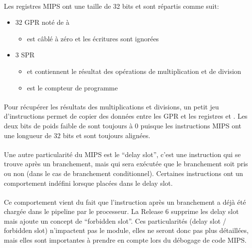 \documentclass[11pt, book, english, french, standardlists]{upmethodology-document}
\begin{document}
				\paragraph*{}
					Les registres \gls{MIPS} ont une taille de 32 bits et sont répartis comme suit:
					\begin{itemize}
						\item 32 \gls{GPR} noté de  à 
							\begin{itemize}
								\item {} est câblé à zéro et les écritures sont ignorées
							\end{itemize}
						\item 3 \gls{SPR}
							\begin{itemize}
								\item {} et  contiennent le résultat des opérations de multiplication et de division
								\item {} est le compteur de programme
							\end{itemize}
					\end{itemize}
				\paragraph*{}
					Pour récupérer les résultats des multiplications et divisions, un petit jeu d'instructions permet de copier des données entre les \gls{GPR} et les registres  et . Les deux bits de poids faible de  sont toujours à 0 puisque les instructions \gls{MIPS} ont une longueur de 32 bits et sont toujours alignées.
				\paragraph*{}
					Une autre particularité du \gls{MIPS} est le ``delay slot'', c'est une instruction qui se trouve après un branchement, mais qui sera exécutée que le branchement soit pris ou non (dans le cas de branchement conditionnel). Certaines instructions ont un comportement indéfini lorsque placées dans le delay slot.
				\paragraph*{}
					Ce comportement vient du fait que l'instruction après un branchement a déjà été chargée dans le pipeline par le processeur. La Release 6 supprime les delay slot mais ajoute un concept de ``forbidden slot''. Ces particularités (delay slot / forbidden slot) n'impactent pas le module, elles ne seront donc pas plus détaillées, mais elles sont importantes à prendre en compte lors du débogage de code MIPS.
\end{document}
